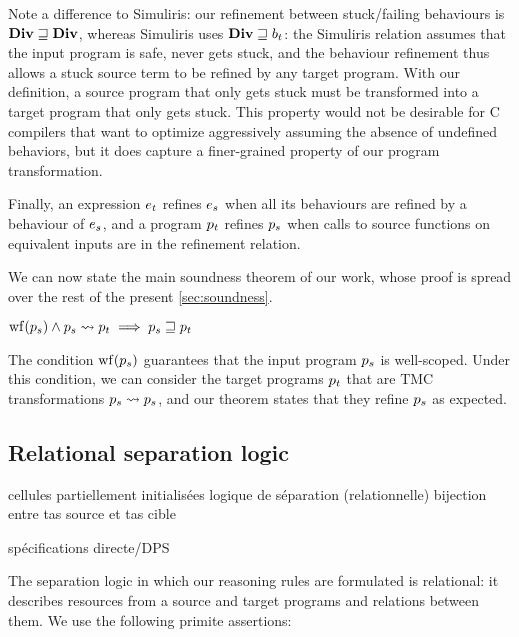 Note a difference to Simuliris: our refinement between stuck/failing behaviours is $\constr{Div} \refined \constr{Div}$, whereas Simuliris uses $\constr{Div} \refined b_t$: the Simuliris relation assumes that the input program is safe, never gets stuck, and the behaviour refinement thus allows a stuck source term to be refined by any target program. With our definition, a source program that only gets stuck must be transformed into a target program that only gets stuck.
This property would not be desirable for C compilers that want to optimize aggressively assuming the absence of undefined behaviors, but it does capture a finer-grained property of our program transformation.

Finally, an expression $\datalangExpr_t$ refines $\datalangExpr_s$ when all its behaviours are refined by a behaviour of $\datalangExpr_s$, and a program $\datalangProg_t$ refines $\datalangProg_s$ when calls to source functions on equivalent inputs are in the refinement relation.

We can now state the main soundness theorem of our work, whose proof is spread over the rest of the present \cref{sec:soundness}.

\begin{theorem}[Soundness]
    $
        \wf{\datalangProg_s} \wedge \datalangProg_s \tmc \datalangProg_t \implies
        \datalangProg_s \refined \datalangProg_t
    $
\end{theorem}

The condition $\wf{\datalangProg_s}$ guarantees that the input program $\datalangProg_s$ is well-scoped. Under this condition, we can consider the target programs $\datalangProg_t$ that are TMC transformations $\datalangProg_s \tmc \datalangProg_s$, and our theorem states that they refine $\datalangProg_s$ as expected.




\subsection{Relational separation logic}

cellules partiellement initialisées
logique de séparation (relationnelle)
bijection entre tas source et tas cible

spécifications directe/DPS


The separation logic in which our reasoning rules are formulated is relational: it describes resources from a source and target programs and relations between them. We use the following primite assertions:

